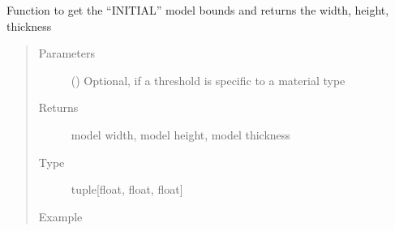 \documentclass[letterpaper,10pt,english]{sphinxmanual}
\begin{document}
\begin{fulllineitems}
\begin{fulllineitems}
\begin{quote}
\begin{description}
\begin{sphinxVerbatim}[commandchars=\\\{\}]
\end{sphinxVerbatim}

\end{description}\end{quote}

\end{fulllineitems}


\begin{fulllineitems}
\label{\detokenize{openfdem:openfdem.openfdem.Model.model_dimensions}}
Function to get the “INITIAL” model bounds and returns the width, height, thickness
\begin{quote}\begin{description}
\item[{Parameters}] \leavevmode
{} () \textendash{} Optional, if a threshold is specific to a material type

\item[{Returns}] \leavevmode
model width, model height, model thickness

\item[{Type}] \leavevmode
tuple{[}float, float, float{]}

\item[{Example}] \leavevmode
\begin{sphinxVerbatim}[commandchars=\\\{\}]
   
  


\end{sphinxVerbatim}
\end{description}
\end{quote}
\end{fulllineitems}
\end{fulllineitems}
\end{document}
